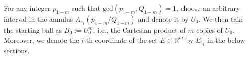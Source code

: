 \documentclass[11pt]{amsart}
\numberwithin{equation}{section}
\newcommand{\0}{\mathbf{0}}
\theoremstyle{remark}
\newtheorem{remark}{{Remark}}
\begin{document}
{%
For any integer $p_{1-m}$ such that $\textrm{gcd}(p_{1-m},Q_{1-m})=1$, choose an arbitrary interval in the annulus $A_{c_1}(p_{1-m}/Q_{1-m})$ and denote it by $U_0$. We then take the starting ball as $B_0:=U_0^m$, i.e., the Cartesian product of $m$ copies of $U_0$.
Moreover, we denote the $i$-th coordinate
of the set $E\subset \mathbb{R}^m$ by $E\vert_i$ in the below sections.

}
\end{document}
